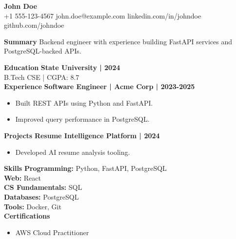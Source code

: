 \documentclass[10pt]{article}
\begin{document}
\begin{center}
    {\LARGE \textbf{John Doe}} \\
    +1 555-123-4567 \textbar{} john.doe@example.com \textbar{} linkedin.com/in/johndoe \textbar{} github.com/johndoe
\end{center}

\textbf{Summary}
Backend engineer with experience building FastAPI services and PostgreSQL-backed APIs.

\textbf{Education}
\textbf{State University | 2024}\\
B.Tech CSE | CGPA: 8.7\\

\textbf{Experience}
\textbf{Software Engineer | Acme Corp | 2023-2025}
\begin{itemize}
\item Built REST APIs using Python and FastAPI.
\item Improved query performance in PostgreSQL.
\end{itemize}

\textbf{Projects}
\textbf{Resume Intelligence Platform | 2024}
\begin{itemize}
\item Developed AI resume analysis tooling.
\end{itemize}

\textbf{Skills}
\textbf{Programming:} Python, FastAPI, PostgreSQL\\
\textbf{Web:} React\\
\textbf{CS Fundamentals:} SQL\\
\textbf{Databases:} PostgreSQL\\
\textbf{Tools:} Docker, Git\\

\textbf{Certifications}
\begin{itemize}
\item AWS Cloud Practitioner
\end{itemize}
\end{document}

